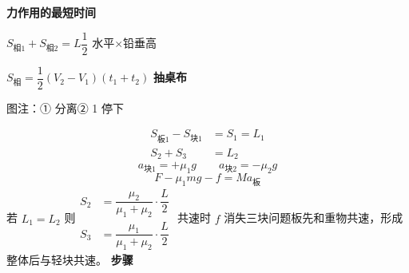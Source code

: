 \textbf{力作用的最短时间}

\noindent $S_{\text{相}1}+S_{\text{相}2}=L$\quad $\dfrac12$ 水平$\times$铅垂高

\noindent $S_{\text{相}}=\dfrac12(V_2-V_1)(t_1+t_2)$
\textbf{抽桌布}

\noindent 图注：① 分离\quad ② 1 停下

\begin{align*}
S_{\text{板}1}-S_{\text{块}1}&=S_1=L_1\\
S_2+S_3&=L_2
\end{align*}
\[
a_{\text{块}1}=+\mu_1g\qquad a_{\text{块}2}=-\mu_2g
\]
\[
F-\mu_1mg-f=Ma_{\text{板}}
\]
\noindent 若 $L_1=L_2$ 则\quad $\begin{aligned}S_2&=\dfrac{\mu_2}{\mu_1+\mu_2}\cdot\dfrac L2\\[4pt] S_3&=\dfrac{\mu_1}{\mu_1+\mu_2}\cdot\dfrac L2\end{aligned}$
\noindent 共速时 $f$ 消失\qquad 三块问题\qquad 板先和重物共速，形成整体后与轻块共速。
\textbf{步骤}


